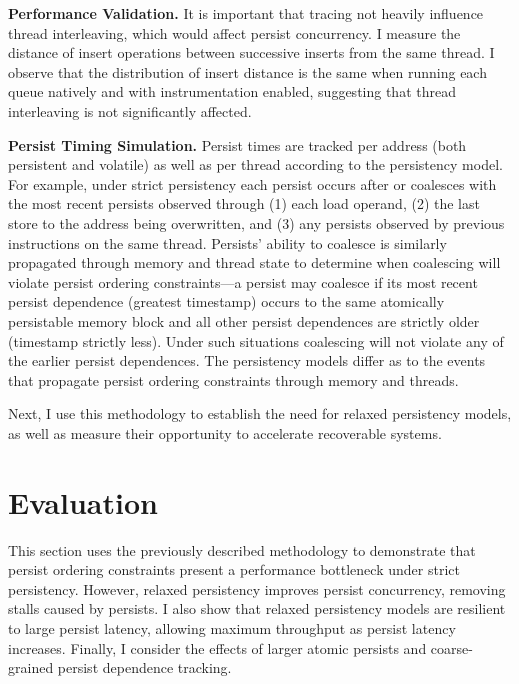 \textbf{Performance Validation.}
It is important that tracing not heavily influence thread interleaving, which would affect persist concurrency.
I measure the distance of insert operations between successive inserts from the same thread.
I observe that the distribution of insert distance is the same when running each queue natively and with instrumentation enabled, suggesting that thread interleaving is not significantly affected.

\textbf{Persist Timing Simulation.}
Persist times are tracked per address (both persistent and volatile) as well as per thread according to the persistency model.
For example, under strict persistency each persist occurs after or coalesces with the most recent persists observed through (1) each load operand, (2) the last store to the address being overwritten, and (3) any persists observed by previous instructions on the same thread.
Persists' ability to coalesce is similarly propagated through memory and thread state to determine when coalescing will violate persist ordering constraints---a persist may coalesce if its most recent persist dependence (greatest timestamp) occurs to the same atomically persistable memory block and all other persist dependences are strictly older (timestamp strictly less).
Under such situations coalescing will not violate any of the earlier persist dependences.
The persistency models differ as to the events that propagate persist ordering constraints through memory and threads.

Next, I use this methodology to establish the need for relaxed persistency models, as well as measure their opportunity to accelerate recoverable systems.

\section{Evaluation}
\label{sec:PersistencyEval:Evaluation}

This section uses the previously described methodology to demonstrate that persist ordering constraints present a performance bottleneck under strict persistency.
However, relaxed persistency improves persist concurrency, removing stalls caused by persists.
I also show that relaxed persistency models are resilient to large persist latency, allowing maximum throughput as persist latency increases.
Finally, I consider the effects of larger atomic persists and coarse-grained persist dependence tracking. 

